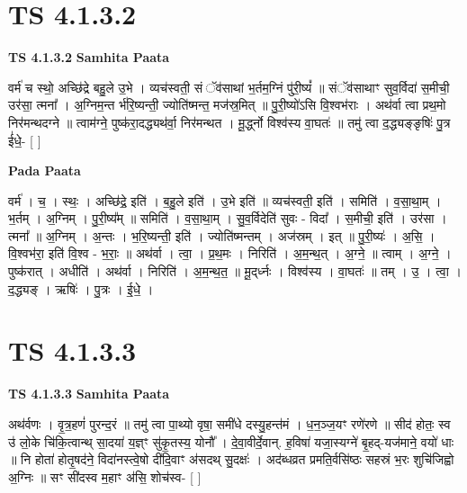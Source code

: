 \documentclass[17pt]{extarticle}
\begin{document}
\section*{ TS 4.1.3.2 }

\textbf{TS 4.1.3.2 } \newline
\textbf{Samhita Paata} \newline

वर्म॑ च स्थो॒ अच्छि॑द्रे बहु॒ले उ॒भे । व्यच॑स्वती॒ सं ॅव॑साथां भ॒र्तम॒ग्निं पु॑री॒ष्यं᳚ ॥ संॅव॑साथाꣳ सुव॒र्विदा॑ स॒मीची॒ उर॑सा॒ त्मना᳚ । अ॒ग्निम॒न्त र्भ॑रि॒ष्यन्ती॒ ज्योति॑ष्मन्त॒ मज॑स्र॒मित् ॥ पु॒री॒ष्यो॑ऽसि वि॒श्वभ॑राः । अथ॑र्वा त्वा प्रथ॒मो निर॑मन्थदग्ने ॥ त्वाम॑ग्ने॒ पुष्क॑रा॒दद्ध्यथ॑र्वा॒ निर॑मन्थत । मू॒र्द्ध्नो विश्व॑स्य वा॒घतः॑ ॥ तमु॑ त्वा द॒द्ध्यङ्ङृषिः॑ पु॒त्र ई॑धे॒- [  ] \newline

\textbf{Pada Paata} \newline

वर्म॑ । च॒ । स्थः॒ । अच्छि॑द्रे॒ इति॑ । ब॒हु॒ले इति॑ । उ॒भे इति॑ ॥ व्यच॑स्वती॒ इति॑ । समिति॑ । व॒सा॒था॒म् । भ॒र्तम् । अ॒ग्निम् । पु॒री॒ष्य᳚म् ॥ समिति॑ । व॒सा॒था॒म् । सु॒व॒र्विदेति॑ सुवः - विदा᳚ । स॒मीची॒ इति॑ । उर॑सा । त्मना᳚ ॥ अ॒ग्निम् । अ॒न्तः । भ॒रि॒ष्यन्ती॒ इति॑ । ज्योति॑ष्मन्तम् । अज॑स्रम् । इत् ॥ पु॒री॒ष्यः॑ । अ॒सि॒ । वि॒श्वभ॑रा॒ इति॑ वि॒श्व - भ॒राः॒ ॥ अथ॑र्वा । त्वा॒ । प्र॒थ॒मः । निरिति॑ । अ॒म॒न्थ॒त् । अ॒ग्ने॒ ॥ त्वाम् । अ॒ग्ने॒ । पुष्क॑रात् । अधीति॑ । अथ॑र्वा । निरिति॑ । अ॒म॒न्थ॒त॒ ॥ मू॒द्‌र्ध्नः । विश्व॑स्य । वा॒घतः॑ ॥ तम् । उ॒ । त्वा॒ । द॒द्ध्यङ् । ऋषिः॑ । पु॒त्रः । ई॒धे॒ ।  \newline




\section*{ TS 4.1.3.3 }

\textbf{TS 4.1.3.3 } \newline
\textbf{Samhita Paata} \newline

अथ॑र्वणः । वृ॒त्र॒हणं॑ पुरन्द॒रं ॥ तमु॑ त्वा पा॒थ्यो वृषा॒ समी॑धे दस्यु॒हन्त॑मं । ध॒न॒ञ्ज॒यꣳ रणे॑रणे ॥ सीद॑ होतः॒ स्व उ॑ लो॒के चि॑कि॒त्वान्थ् सा॒दया॑ य॒ज्ञ्ꣳ सु॑कृ॒तस्य॒ योनौ᳚ । दे॒वा॒वीर्दे॒वान्. ह॒विषा॑ यजा॒स्यग्ने॑ बृ॒हद्-यज॑माने॒ वयो॑ धाः ॥ नि होता॑ होतृ॒षद॑ने॒ विदा॑नस्त्वे॒षो दी॑दि॒वाꣳ अ॑सदथ् सु॒दक्षः॑ । अद॑ब्धव्रत प्रमति॒र्वसि॑ष्ठः सहस्रं भ॒रः शुचि॑जिह्वो अ॒ग्निः ॥ सꣳ सी॑दस्व म॒हाꣳ अ॑सि॒ शोच॑स्व- [  ] \newline
\end{document}
